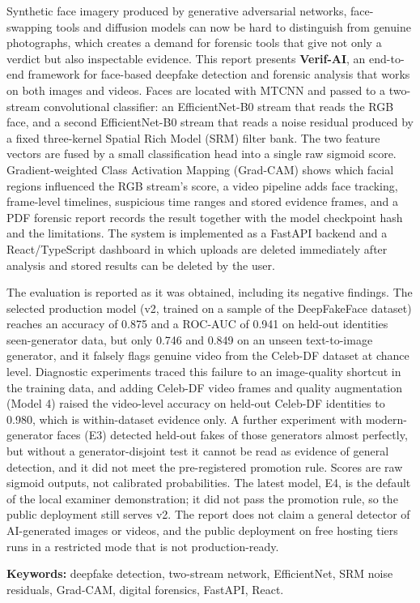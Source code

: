 Synthetic face imagery produced by generative adversarial networks, face-swapping tools and diffusion models can now be hard to
distinguish from genuine photographs, which creates a demand for forensic tools that give not only a verdict but also inspectable evidence.
This report presents \textbf{Verif-AI}, an end-to-end framework for face-based deepfake detection and forensic analysis that works on both
images and videos. Faces are located with MTCNN and passed to a two-stream convolutional classifier: an EfficientNet-B0 stream that
reads the RGB face, and a second EfficientNet-B0 stream that reads a noise residual produced by a fixed three-kernel Spatial Rich Model
(SRM) filter bank. The two feature vectors are fused by a small classification head into a single raw sigmoid score. Gradient-weighted
Class Activation Mapping (Grad-CAM) shows which facial regions influenced the RGB stream's score, a video pipeline adds face tracking,
frame-level timelines, suspicious time ranges and stored evidence frames, and a PDF forensic report records the result together with the
model checkpoint hash and the limitations. The system is implemented as a FastAPI backend and a React/TypeScript dashboard in which
uploads are deleted immediately after analysis and stored results can be deleted by the user.

The evaluation is reported as it was obtained, including its negative findings. The selected production model (v2, trained on a sample of
the DeepFakeFace dataset) reaches an accuracy of 0.875 and a ROC-AUC of 0.941 on held-out identities seen-generator data, but only 0.746 and 0.849 on an
unseen text-to-image generator, and it falsely flags genuine video from the Celeb-DF dataset at chance level. Diagnostic experiments
traced this failure to an image-quality shortcut in the training data, and adding Celeb-DF video frames and quality augmentation (Model 4)
raised the video-level accuracy on held-out Celeb-DF identities to 0.980, which is within-dataset evidence only. A further experiment
with modern-generator faces (E3) detected held-out fakes of those generators almost perfectly, but without a generator-disjoint test it
cannot be read as evidence of general detection, and it did not meet the pre-registered promotion rule. Scores are raw sigmoid outputs,
not calibrated probabilities. The latest model, E4, is the default of the local examiner demonstration; it did not pass the promotion rule, so the public deployment still serves v2. The report does not claim a general detector of AI-generated images or videos, and the public deployment on
free hosting tiers runs in a restricted mode that is not production-ready.

\medskip\noindent\textbf{Keywords:} deepfake detection, two-stream network, EfficientNet, SRM noise residuals, Grad-CAM, digital forensics, FastAPI, React.
